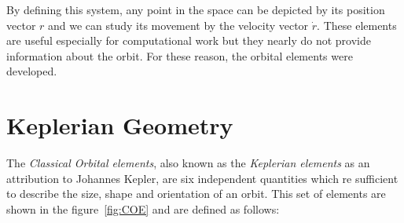 By defining this system, any point in the space can be depicted by its position vector $r$ and we can study its movement by the velocity vector $\dot{r}$. These elements are useful especially for computational work but they nearly do not provide information about the orbit. For these reason, the orbital elements were developed.

\section{Keplerian Geometry}
The \textit{Classical Orbital elements}, also known as the \textit{Keplerian elements} as an attribution to Johannes Kepler, are six independent quantities which re sufficient to describe the size, shape and orientation of an orbit. This set of elements are shown in the figure~\ref{fig:COE} and are defined as follows:

